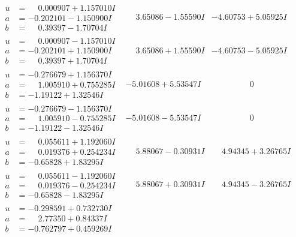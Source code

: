 \documentclass[1p]{elsarticle_modified}
\theoremstyle{definition}
\begin{document}
$$\begin{array}{c|c|c}
\begin{aligned}
u &= \phantom{-}0.000907 + 1.157010 I \\
a &= -0.202101 - 1.150900 I \\
b &= \phantom{-}0.39397 - 1.70704 I\end{aligned}
 & \phantom{-}3.65086 - 1.55590 I & -4.60753 + 5.05925 I \\ \hline\begin{aligned}
u &= \phantom{-}0.000907 - 1.157010 I \\
a &= -0.202101 + 1.150900 I \\
b &= \phantom{-}0.39397 + 1.70704 I\end{aligned}
 & \phantom{-}3.65086 + 1.55590 I & -4.60753 - 5.05925 I \\ \hline\begin{aligned}
u &= -0.276679 + 1.156370 I \\
a &= \phantom{-}1.005910 + 0.755285 I \\
b &= -1.19122 + 1.32546 I\end{aligned}
 & -5.01608 + 5.53547 I & \phantom{-0.000000 } 0 \\ \hline\begin{aligned}
u &= -0.276679 - 1.156370 I \\
a &= \phantom{-}1.005910 - 0.755285 I \\
b &= -1.19122 - 1.32546 I\end{aligned}
 & -5.01608 - 5.53547 I & \phantom{-0.000000 } 0 \\ \hline\begin{aligned}
u &= \phantom{-}0.055611 + 1.192060 I \\
a &= \phantom{-}0.019376 + 0.254234 I \\
b &= -0.65828 + 1.83295 I\end{aligned}
 & \phantom{-}5.88067 - 0.30931 I & \phantom{-}4.94345 + 3.26765 I \\ \hline\begin{aligned}
u &= \phantom{-}0.055611 - 1.192060 I \\
a &= \phantom{-}0.019376 - 0.254234 I \\
b &= -0.65828 - 1.83295 I\end{aligned}
 & \phantom{-}5.88067 + 0.30931 I & \phantom{-}4.94345 - 3.26765 I \\ \hline\begin{aligned}
u &= -0.298591 + 0.732730 I \\
a &= \phantom{-}2.77350 + 0.84337 I \\
b &= -0.762797 + 0.459269 I\end{aligned}

\end{array}$$
\end{document}
